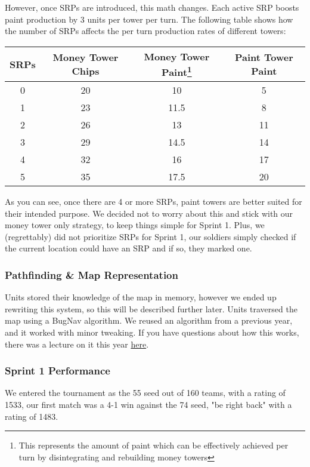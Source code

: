 \documentclass{article}
\begin{document}
  However, once SRPs are introduced, this math changes. Each active SRP boosts paint production by 3 units per tower per turn. The following table shows how the number of SRPs affects the per turn production rates of different towers:
  \begin{center}
    \begin{tabular}{c | c | c | c}
      SRPs & Money Tower Chips & Money Tower Paint\footnote{This represents the amount of paint which can be effectively achieved per turn by disintegrating and rebuilding money towers} & Paint Tower Paint \\
      \hline
      0 & 20 & 10 & 5 \\
      1 & 23 & 11.5 & 8 \\
      2 & 26 & 13 & 11 \\
      3 & 29 & 14.5 & 14 \\
      4 & 32 & 16 & 17 \\
      5 & 35 & 17.5 & 20
    \end{tabular}
  \end{center}
  As you can see, once there are 4 or more SRPs, paint towers are better suited for their intended purpose. We decided not to worry about this and stick with our money tower only strategy, to keep things simple for Sprint 1. Plus, we (regrettably) did not prioritize SRPs for Sprint 1, our soldiers simply checked if the current location could have an SRP and if so, they marked one.

  \subsubsection{Pathfinding \& Map Representation}

  Units stored their knowledge of the map in memory, however we ended up rewriting this system, so this will be described further later. Units traversed the map using a BugNav algorithm. We reused an algorithm from a previous year, and it worked with minor tweaking. If you have questions about how this works, there was a lecture on it this year \href{https://www.youtube.com/live/Mqk50BQH3oQ?si=6qL5WAXmSOS2K3OR}{here}.

  \subsubsection{Sprint 1 Performance}

  We entered the tournament as the 55 seed out of 160 teams, with a rating of 1533, our first match was a 4-1 win against the 74 seed, "be right back" with a rating of 1483. 
\end{document}
